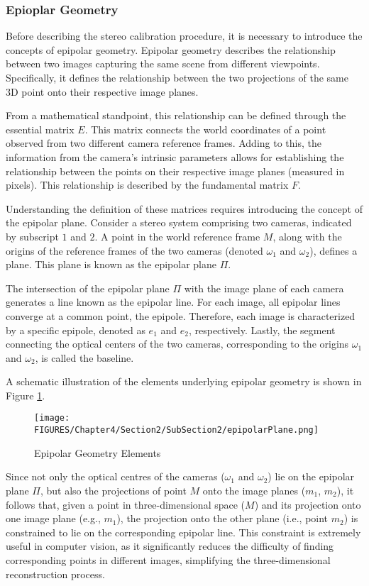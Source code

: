 \subsubsection{Epioplar Geometry}

Before describing the stereo calibration procedure, it is necessary to introduce the concepts of epipolar geometry. 
Epipolar geometry describes the relationship between two images capturing the same scene from different viewpoints. Specifically, it defines the relationship between the two projections of the same 3D point onto their respective image planes.

From a mathematical standpoint, this relationship can be defined through the essential matrix  $E$. This matrix connects the world coordinates of a point observed from two different camera reference frames. Adding to this, the information from the camera's intrinsic parameters allows for establishing the relationship between the points on their respective image planes (measured in pixels). This relationship is described by the fundamental matrix  $F$.

Understanding the definition of these matrices requires introducing the concept of the epipolar plane. Consider a stereo system comprising two cameras, indicated by subscript $1$ and $2$.
A point in the world reference frame $M$, along with the origins of the reference frames of the two cameras (denoted $\omega_1$ and $\omega_2$), defines a plane. This plane is known as the epipolar plane $\Pi$.

The intersection of the epipolar plane $\Pi$ with the image plane of each camera generates a line known as the epipolar line. For each image, all epipolar lines converge at a common point, the epipole. Therefore, each image is characterized by a specific epipole, denoted as $e_1$ and $e_2$, respectively.
Lastly, the segment connecting the optical centers of the two cameras, corresponding to the origins $\omega_1$ and $\omega_2$, is called the baseline.

A schematic illustration of the elements underlying epipolar geometry is shown in Figure \ref{fig:epipolaPlane}.

\begin{figure}[!h]
  \centering
  \texttt{[image: FIGURES/Chapter4/Section2/SubSection2/epipolarPlane.png]}
  \caption{Epipolar Geometry Elements} 
  \label{fig:epipolaPlane}  
\end{figure}

Since not only the optical centres of the cameras ($\omega_1$ and $\omega_2$) lie on the epipolar plane $\Pi$, but also the projections of point $M$ onto the image planes ($m_1$, $m_2$), it follows that, given a point in three-dimensional space ($M$) and its projection onto one image plane (e.g., $m_1$), the projection onto the other plane (i.e., point $m_2$) is constrained to lie on the corresponding epipolar line.  
This constraint is extremely useful in computer vision, as it significantly reduces the difficulty of finding corresponding points in different images, simplifying the three-dimensional reconstruction process.  

